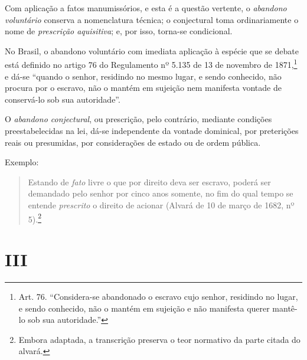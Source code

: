 Com aplicação a fatos manumissórios, e esta é a questão vertente, o
\emph{abandono voluntário} conserva a nomenclatura técnica; o
conjectural toma ordinariamente o nome de \emph{prescrição aquisitiva};
e, por isso, torna-se condicional.

No Brasil, o abandono voluntário com imediata aplicação à espécie que se
debate está definido no artigo 76 do Regulamento nº 5.135 de 13 de
novembro de 1871,\footnote{Art. 76. ``Considera-se abandonado o escravo
  cujo senhor, residindo no lugar, e sendo conhecido, não o mantém em
  sujeição e não manifesta querer mantê-lo sob sua autoridade.''} e dá-se
``quando o senhor, residindo no mesmo lugar, e sendo conhecido, não
procura por o escravo, não o mantém em sujeição nem manifesta vontade de
conservá-lo sob sua autoridade''.

O \emph{abandono conjectural}, ou prescrição, pelo contrário, mediante
condições preestabelecidas na lei, dá-se independente da vontade
dominical, por preterições reais ou presumidas, por considerações de
estado ou de ordem pública.

Exemplo:

\begin{quote}
Estando de \emph{fato} livre o que por direito deva ser escravo, poderá
ser demandado pelo senhor por cinco anos somente, no fim do qual tempo
se entende \emph{prescrito} o direito de acionar (Alvará de 10 de março
de 1682, nº 5).\footnote{Embora adaptada, a transcrição preserva o
  teor normativo da parte citada do alvará.}
\end{quote}

\section*{III}


